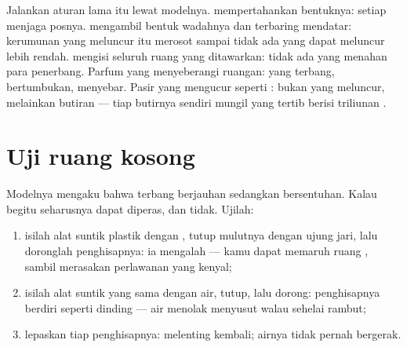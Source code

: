 \begin{example}\label{ex:g7:states-of-matter:rules}
Jalankan aturan lama itu lewat modelnya.  mempertahankan
bentuknya: setiap  menjaga posnya.  mengambil bentuk
wadahnya dan terbaring mendatar: kerumunan yang meluncur itu merosot
sampai tidak ada  yang dapat meluncur lebih rendah.  mengisi
seluruh ruang yang ditawarkan: tidak ada yang menahan para penerbang.
Parfum yang menyeberangi ruangan:   yang terbang,
bertumbukan, menyebar. Pasir yang mengucur seperti : bukan
 yang meluncur, melainkan butiran --- tiap butirnya sendiri  mungil yang tertib berisi triliunan .
\end{example}

\section{Uji ruang kosong}

\begin{method}\label{met:g7:states-of-matter:syringe}
Modelnya mengaku bahwa   terbang berjauhan sedangkan 
 bersentuhan. Kalau begitu  seharusnya dapat diperas, dan
 tidak. Ujilah:
\begin{enumerate}
  \item isilah alat suntik plastik dengan , tutup mulutnya
        dengan ujung jari, lalu doronglah penghisapnya: ia mengalah
        --- kamu dapat memaruh ruang , sambil merasakan
        perlawanan yang kenyal;
  \item isilah alat suntik yang sama dengan air, tutup, lalu dorong:
        penghisapnya berdiri seperti dinding --- air menolak menyusut
        walau sehelai rambut;
  \item lepaskan tiap penghisapnya:  melenting kembali;
        airnya tidak pernah bergerak.
\end{enumerate}
\end{method}

